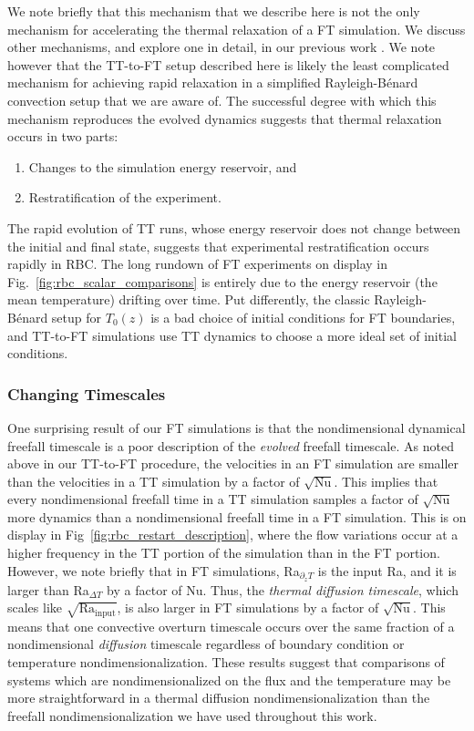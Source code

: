 \documentclass[aps, pre, onecolumn, nofootinbib, notitlepage, groupedaddress, amsfonts, amssymb, amsmath, longbibliography, superscriptaddress]{revtex4-1}
\newcommand{\RB}{Rayleigh-B\'{e}nard }
\begin{document}
We note briefly that this mechanism that we describe here is not the only mechanism for accelerating the thermal relaxation of a FT simulation.
We discuss other mechanisms, and explore one in detail, in our previous work \cite{anders&all2018}.
We note however that the TT-to-FT setup described here is likely the least complicated mechanism for achieving rapid relaxation in a simplified \RB convection setup that we are aware of.
The successful degree with which this mechanism reproduces the evolved dynamics suggests that thermal relaxation occurs in two parts:
\begin{enumerate}
\item Changes to the simulation energy reservoir, and
\item Restratification of the experiment.
\end{enumerate}
The rapid evolution of TT runs, whose energy reservoir does not change between the initial and final state, suggests that experimental restratification occurs rapidly in RBC. 
The long rundown of FT experiments on display in Fig.~\ref{fig:rbc_scalar_comparisons} is entirely due to the energy reservoir (the mean temperature) drifting over time.
Put differently, the classic \RB setup for $T_0(z)$ is a bad choice of initial conditions for FT boundaries, and TT-to-FT simulations use TT dynamics to choose a more ideal set of initial conditions.


\subsubsection{Changing Timescales}
\label{sec:timescales}
One surprising result of our FT simulations is that the nondimensional dynamical freefall timescale is a poor description of the \emph{evolved} freefall timescale.
As noted above in our TT-to-FT procedure, the velocities in an FT simulation are smaller than the velocities in a TT simulation by a factor of $\sqrt{\text{Nu}}$.
This implies that every nondimensional freefall time in a TT simulation samples a factor of $\sqrt{\text{Nu}}$ more dynamics than a nondimensional freefall time in a FT simulation.
This is on display in Fig~\ref{fig:rbc_restart_description}, where the flow variations occur at a higher frequency in the TT portion of the simulation than in the FT portion.
However, we note briefly that in FT simulations, Ra$_{\partial_z T}$ is the input Ra, and it is larger than Ra$_{\Delta T}$ by a factor of $\text{Nu}$.
Thus, the \emph{thermal diffusion timescale}, which scales like $\sqrt{\text{Ra}_{\text{input}}}$, is also larger in FT simulations by a factor of $\sqrt{\text{Nu}}$.
This means that one convective overturn timescale occurs over the same fraction of a nondimensional \emph{diffusion} timescale regardless of boundary condition or temperature nondimensionalization.
These results suggest that comparisons of systems which are nondimensionalized on the flux and the temperature may be more straightforward in a thermal diffusion nondimensionalization \cite{goluskin2015} than the freefall nondimensionalization we have used throughout this work.
\end{document}
